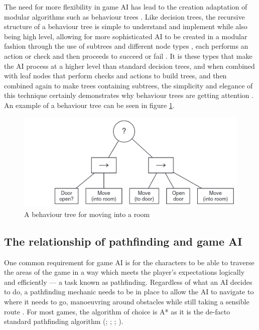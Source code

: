\documentclass[11pt, a4paper]{report}
\begin{document}
The need for more flexibility in game AI has lead to the creation adaptation of modular algorithms such as behaviour trees \parencite[1]{lim2010evolving}. Like decision trees, the recursive structure of a behaviour tree is simple to understand and implement while also being high level, allowing for more sophisticated AI to be created in a modular fashion through the use of subtrees and different node types \parencite[144]{shoulson2011parameterizing}, each performs an action or check and then proceeds to succeed or fail \parencite[4]{lim2010evolving}. It is these types that make the AI process at a higher level than standard decision trees, and when combined with leaf nodes that perform checks and actions to build trees, and then combined again to make trees containing subtrees, the simplicity and elegance of this technique certainly demonstrates why behaviour trees are getting attention \parencite[144]{shoulson2011parameterizing}. An example of a behaviour tree can be seen in figure \ref{fig:behaviourTree}.

\begin{figure}[!h]
  \centering
  \includegraphics[width=12cm]{img/behaviour_trees.png}
  \caption{A behaviour tree for moving into a room \parencite[337]{millington2019ai}}
  \label{fig:behaviourTree}
\end{figure}

\subsection{The relationship of pathfinding and game AI}
\label{subsec:theRelationshipOfPathfindingAndGameAI}

One common requirement for game AI is for the characters to be able to traverse the areas of the game in a way which meets the player's expectations logically and efficiently --- a task known as pathfinding. Regardless of what an AI decides to do, a pathfinding mechanic needs to be in place to allow the AI to navigate to where it needs to go, manoeuvring around obstacles while still taking a sensible route \parencite[60]{graham2003pathfinding}. For most games, the algorithm of choice is A* as it is the de-facto standard pathfinding algorithm (\cite[197]{millington2019ai}; \cite[2]{botea2004near}; \cite[64]{nareyek2004ai}; \cite[73]{leigh2007using}).
\end{document}

